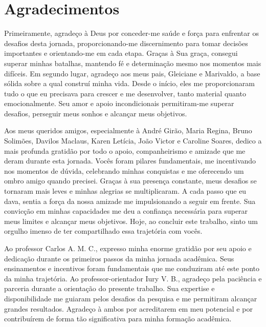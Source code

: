 \chapter*{Agradecimentos}
\thispagestyle{empty}

Primeiramente, agradeço à Deus por conceder-me saúde e força para enfrentar os desafios desta jornada, proporcionando-me discernimento para tomar decisões importantes e orientando-me em cada etapa. Graças à Sua graça, consegui superar minhas batalhas, mantendo fé e determinação mesmo nos momentos mais difíceis. Em segundo lugar, agradeço aos meus pais, Gleiciane e Marivaldo, a base sólida sobre a qual construí minha vida. Desde o início, eles me proporcionaram tudo o que eu precisava para crescer e me desenvolver, tanto material quanto emocionalmente. Seu amor e apoio incondicionais permitiram-me superar desafios, perseguir meus sonhos e alcançar meus objetivos.

Aos meus queridos amigos, especialmente à André Girão, Maria Regina, Bruno Solimões, Davilos Maclaus, Karen Letícia, João Victor e Caroline Soares, dedico a mais profunda gratidão por todo o apoio, companheirismo e amizade que me deram durante esta jornada. Vocês foram pilares fundamentais, me incentivando nos momentos de dúvida, celebrando minhas conquistas e me oferecendo um ombro amigo quando precisei. Graças à sua presença constante, meus desafios se tornaram mais leves e minhas alegrias se multiplicaram. A cada passo que eu dava, sentia a força da nossa amizade me impulsionando a seguir em frente. Sua convicção em minhas capacidades me deu a confiança necessária para superar meus limites e alcançar meus objetivos. Hoje, ao concluir este trabalho, sinto um orgulho imenso de ter compartilhado essa trajetória com vocês.

Ao professor Carlos A. M. C., expresso minha enorme gratidão por seu apoio e dedicação durante os primeiros passos da minha jornada acadêmica. Seus ensinamentos e incentivos foram fundamentais que me conduziram até este ponto da minha trajetória. Ao professor-orientador Iury V. B., agradeço pela paciência e parceria durante a orientação do presente trabalho. Sua expertise e disponibilidade me guiaram pelos desafios da pesquisa e me permitiram alcançar grandes resultados. Agradeço à ambos por acreditarem em meu potencial e por contribuírem de forma tão significativa para minha formação acadêmica.
